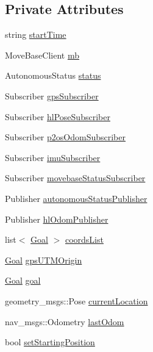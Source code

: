 \subsection*{\-Private \-Attributes}
\begin{DoxyCompactItemize}
\item 
string \hyperlink{classGoalProvider_a6329ae18effbfa5a6eddf9956851c973}{start\-Time}
\item 
\-Move\-Base\-Client \hyperlink{classGoalProvider_a903cb379ce27ab3072fc273f8d344b0b}{mb}
\item 
\-Autonomous\-Status \hyperlink{classGoalProvider_aecddfd46c7aba939da77c5a207a97039}{status}
\item 
\-Subscriber \hyperlink{classGoalProvider_a25af65ca4565bee69daba5c9b2c11b8f}{gps\-Subscriber}
\item 
\-Subscriber \hyperlink{classGoalProvider_a2322770657c65da748d21c844c787f5e}{hl\-Pose\-Subscriber}
\item 
\-Subscriber \hyperlink{classGoalProvider_a5f5494e3cd35116f170082bce82201e5}{p2os\-Odom\-Subscriber}
\item 
\-Subscriber \hyperlink{classGoalProvider_a86cffa9e45e8fdb0813964ca79e4a327}{imu\-Subscriber}
\item 
\-Subscriber \hyperlink{classGoalProvider_a16a3122fd49b058c08a56e8eac93c08b}{movebase\-Status\-Subscriber}
\item 
\-Publisher \hyperlink{classGoalProvider_a8827c194d8a7568578307c30b5947276}{autonomous\-Status\-Publisher}
\item 
\-Publisher \hyperlink{classGoalProvider_a24a2ea4ae8b62c0086602471a57b74d3}{hl\-Odom\-Publisher}
\item 
list$<$ \hyperlink{classGoal}{\-Goal} $>$ \hyperlink{classGoalProvider_a81829c05683244c4450e548129e4cb1d}{coords\-List}
\item 
\hyperlink{classGoal}{\-Goal} \hyperlink{classGoalProvider_a274c71aaace4fb19551ecfd58356744a}{gps\-U\-T\-M\-Origin}
\item 
\hyperlink{classGoal}{\-Goal} \hyperlink{classGoalProvider_a7c8eb368dbd85c32f1000fead79190dc}{goal}
\item 
geometry\-\_\-msgs\-::\-Pose \hyperlink{classGoalProvider_a043ea6fbbd89e54ea39501ae30da8774}{current\-Location}
\item 
nav\-\_\-msgs\-::\-Odometry \hyperlink{classGoalProvider_a35676425f3d7bfcaa409554879d7b3b8}{last\-Odom}
\item 
bool \hyperlink{classGoalProvider_aae2c69715ab4565f5d0e96cd16411444}{set\-Starting\-Position}

\end{DoxyCompactItemize}
